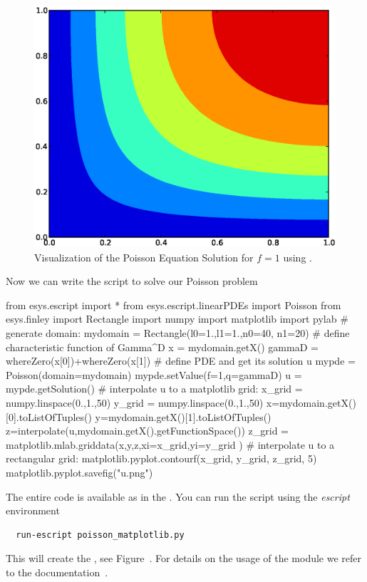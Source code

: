 \begin{figure}
\centerline{\includegraphics[width=\figwidth]{figures/FirstStepResultMATPLOTLIB}}
\caption{Visualization of the Poisson Equation Solution for $f=1$ using \MATPLOTLIB.}
\label{fig:FirstSteps.3b}
\end{figure}

Now we can write the script to solve our Poisson problem
\begin{python}
from esys.escript import *
from esys.escript.linearPDEs import Poisson
from esys.finley import Rectangle
import numpy
import matplotlib
import pylab
# generate domain:
mydomain = Rectangle(l0=1.,l1=1.,n0=40, n1=20)
# define characteristic function of Gamma^D
x = mydomain.getX()
gammaD = whereZero(x[0])+whereZero(x[1])
# define PDE and get its solution u
mypde = Poisson(domain=mydomain)
mypde.setValue(f=1,q=gammaD)
u = mypde.getSolution()
# interpolate u to a matplotlib grid:
x_grid = numpy.linspace(0.,1.,50)
y_grid = numpy.linspace(0.,1.,50)
x=mydomain.getX()[0].toListOfTuples()
y=mydomain.getX()[1].toListOfTuples()
z=interpolate(u,mydomain.getX().getFunctionSpace())
z_grid = matplotlib.mlab.griddata(x,y,z,xi=x_grid,yi=y_grid )
# interpolate u to a rectangular grid:
matplotlib.pyplot.contourf(x_grid, y_grid, z_grid, 5)
matplotlib.pyplot.savefig("u.png")
\end{python}
The entire code is available as  in the \ExampleDirectory.
You can run the script using the {\it escript} environment
\begin{verbatim}
  run-escript poisson_matplotlib.py
\end{verbatim}
This will create the , see Figure~.
For details on the usage of the \MATPLOTLIB module we refer to the documentation~\cite{matplotlib}.

